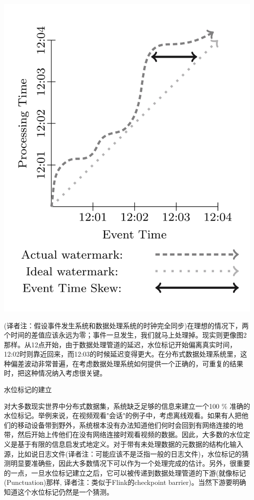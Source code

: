 \documentclass[oneside]{ctexbook}
\begin{document}
\noindent \includegraphics[width=\textwidth]{timedomainskew.png}

(译者注：假设事件发生系统和数据处理系统的时钟完全同步)在理想的情况下，两个时间的差值应该永远为零；事件一旦发生，我们就马上处理掉。现实则更像图2那样。从12点开始，由于数据处理管道的延迟，水位标记开始偏离真实时间，12:02时则靠近回来，而12:03的时候延迟变得更大。在分布式数据处理系统里，这种偏差波动非常普遍，在考虑数据处理系统如何提供一个正确的，可重复的结果时，把这种情况纳入考虑很关键。

水位标记的建立

对大多数现实世界中分布式数据集，系统缺乏足够的信息来建立一个100 \% 准确的水位标记。举例来说，在视频观看"会话"的例子中，考虑离线观看。如果有人把他们的移动设备带到野外，系统根本没有办法知道他们何时会回到有网络连接的地带，然后开始上传他们在没有网络连接时观看视频的数据。因此，大多数的水位定义是基于有限的信息启发式地定义。对于带有未处理数据的元数据的结构化输入源，比如说日志文件(译者注：可能应该不是泛指一般的日志文件)，水位标记的猜测明显要准确些，因此大多数情况下可以作为一个处理完成的估计。另外，很重要的一点，一旦水位标记建立之后，它可以被传递到数据处理管道的下游(就像标记(Punctuation)那样, 译者注：类似于Flink的checkpoint barrier)。当然下游要明确知道这个水位标记仍然是一个猜测。
\end{document}
